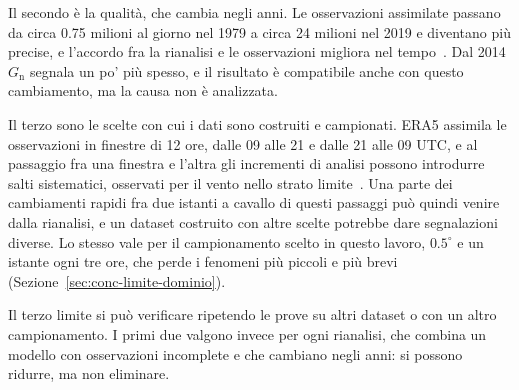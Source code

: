 Il secondo è la qualità, che cambia negli anni. Le osservazioni assimilate passano da circa 0.75 milioni al giorno nel 1979 a circa 24 milioni nel 2019 e diventano più precise, e l'accordo fra la rianalisi e le osservazioni migliora nel tempo~\cite{hersbach2020era5}. Dal 2014 $G_{\mathrm{n}}$ segnala un po' più spesso, e il risultato è compatibile anche con questo cambiamento, ma la causa non è analizzata.

Il terzo sono le scelte con cui i dati sono costruiti e campionati. ERA5 assimila le osservazioni in finestre di 12 ore, dalle 09 alle 21 e dalle 21 alle 09 UTC, e al passaggio fra una finestra e l'altra gli incrementi di analisi possono introdurre salti sistematici, osservati per il vento nello strato limite~\cite{hersbach2020era5}. Una parte dei cambiamenti rapidi fra due istanti a cavallo di questi passaggi può quindi venire dalla rianalisi, e un dataset costruito con altre scelte potrebbe dare segnalazioni diverse. Lo stesso vale per il campionamento scelto in questo lavoro, $0.5^\circ$ e un istante ogni tre ore, che perde i fenomeni più piccoli e più brevi (Sezione~\ref{sec:conc-limite-dominio}).

Il terzo limite si può verificare ripetendo le prove su altri dataset o con un altro campionamento. I primi due valgono invece per ogni rianalisi, che combina un modello con osservazioni incomplete e che cambiano negli anni: si possono ridurre, ma non eliminare.


